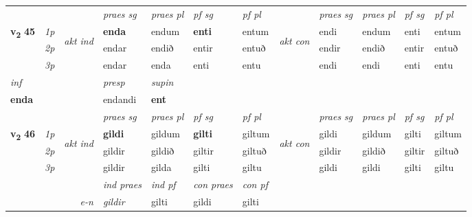 \begin{longtable}[l]{X>{\footnotesize\itshape}llXXXXlXXXX}
 & &   & \textit{praes sg}  & \textit{praes pl}    & \textit{ pf sg} & \textit{pf pl} & & \textit{praes sg}  & \textit{praes pl}    & \textit{pf sg} & \textit{pf pl }  \\ \cmidrule{4-7} \cmidrule{9-12}
 \multirow{2}{*}{{{\textbf{v{\textsubscript{2}}} \Large{\textbf{45}}}}}  & 1p & \multirow{3}{*}{\begin{turn}{90}\textit{akt ind}\end{turn}} & \textbf{enda} & endum & \textbf{enti} & entum & \multirow{3}{*}{\begin{turn}{90}\textit{akt con}\end{turn}} &endi & endum & enti & entum\\*
 & 2p &  &  endar  & endið & entir & entuð & & endir & endið & entir & entuð \\*
 & 3p &  & endar & enda & enti & entu & & endi & endi& enti & entu \\*
\cmidrule{4-7} \cmidrule{9-12}

   {\textit{inf}} & &     & \textit{presp} & \textit{supin}   \\*
  {\textbf{enda}} & &     & endandi &  \textbf{ent}   \\*

\midrule

 & &   & \textit{praes sg}  & \textit{praes pl}    & \textit{ pf sg} & \textit{pf pl} & & \textit{praes sg}  & \textit{praes pl}    & \textit{pf sg} & \textit{pf pl }  \\ \cmidrule{4-7} \cmidrule{9-12}
 \multirow{2}{*}{{{\textbf{v{\textsubscript{2}}} \Large{\textbf{46}}}}}  & 1p & \multirow{3}{*}{\begin{turn}{90}\textit{akt ind}\end{turn}} & \textbf{gildi} & gildum & \textbf{gilti} & giltum & \multirow{3}{*}{\begin{turn}{90}\textit{akt con}\end{turn}} &gildi & gildum & gilti & giltum\\*
 & 2p &  &  gildir  & gildið & giltir & giltuð & & gildir & gildið & giltir & giltuð \\*
 & 3p &  & gildir & gilda & gilti & giltu & & gildi & gildi& gilti & giltu \\*
\cmidrule{4-7} \cmidrule{9-12}

   && &  \textit{ind praes} & \textit{ind pf} & \textit{con praes} & \textit{con pf} \\*
\multicolumn{3}{r}{\textit{e-n}} & gildir & gilti & gildi & gilti \\*


\end{longtable}
